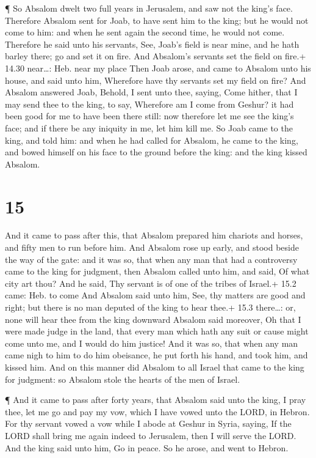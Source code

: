  ¶ So Absalom dwelt two full years in Jerusalem, and saw
not the king's face.  Therefore Absalom sent for Joab, to
have sent him to the king; but he would not come to him: and when he
sent again the second time, he would not come.  Therefore
he said unto his servants, See, Joab's field is near mine, and he hath
barley there; go and set it on fire. And Absalom's servants set the
field on fire.+ 14.30 near\ldots: Heb. near my place  Then
Joab arose, and came to Absalom unto his house, and said unto him,
Wherefore have thy servants set my field on fire?  And
Absalom answered Joab, Behold, I sent unto thee, saying, Come hither,
that I may send thee to the king, to say, Wherefore am I come from
Geshur? it had been good for me to have been there still: now therefore
let me see the king's face; and if there be any iniquity in me, let him
kill me.  So Joab came to the king, and told him: and when
he had called for Absalom, he came to the king, and bowed himself on his
face to the ground before the king: and the king kissed Absalom.

\hypertarget{section-14}{%
\section{15}\label{section-14}}

 And it came to pass after this, that Absalom prepared him
chariots and horses, and fifty men to run before him.  And
Absalom rose up early, and stood beside the way of the gate: and it was
so, that when any man that had a controversy came to the king for
judgment, then Absalom called unto him, and said, Of what city art thou?
And he said, Thy servant is of one of the tribes of Israel.+ 15.2 came:
Heb. to come  And Absalom said unto him, See, thy matters
are good and right; but there is no man deputed of the king to hear
thee.+ 15.3 there\ldots: or, none will hear thee from the king downward
 Absalom said moreover, Oh that I were made judge in the
land, that every man which hath any suit or cause might come unto me,
and I would do him justice!  And it was so, that when any
man came nigh to him to do him obeisance, he put forth his hand, and
took him, and kissed him.  And on this manner did Absalom to
all Israel that came to the king for judgment: so Absalom stole the
hearts of the men of Israel.

 ¶ And it came to pass after forty years, that Absalom said
unto the king, I pray thee, let me go and pay my vow, which I have vowed
unto the LORD, in Hebron.  For thy servant vowed a vow while
I abode at Geshur in Syria, saying, If the LORD shall bring me again
indeed to Jerusalem, then I will serve the LORD.  And the
king said unto him, Go in peace. So he arose, and went to Hebron.

